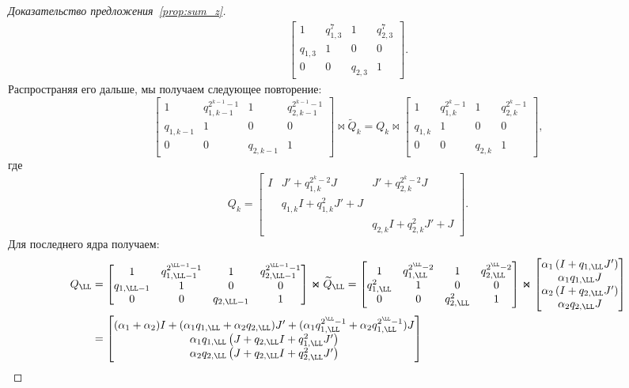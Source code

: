 \begin{proof}[Доказательство предложения~\ref{prop:sum_z}]
\[\begin{split}
\begin{bmatrix}
	1 & q_{1,3}^7 & 1 & q_{2,3}^7 \\
	q_{1,3} & 1 & 0 & 0 \\
	0 & 0 & q_{2,3} & 1
	\end{bmatrix}.
	\end{split} 
	\]
	Распространяя его дальше, мы получаем следующее повторение:
	\[
	\begin{bmatrix}
	1 & q_{1,k-1}^{2^{k-1}-1} & 1 & q_{2,k-1}^{2^{k-1}-1} \\
	q_{1,k-1}& 1 & 0 & 0 \\
	0 & 0 & q_{2,k-1} & 1 
	\end{bmatrix}
	\Join
	{\widetilde Q}_k
	=
	Q_k \Join 
	\begin{bmatrix}
	1 & q_{1,k}^{2^{k}-1} & 1 & q_{2,k}^{2^{k}-1} \\
	q_{1,k}& 1 & 0 & 0 \\
	0 & 0 & q_{2,k} & 1 
	\end{bmatrix},
	\]
	где
	\[
	Q_k = 
	\begin{bmatrix}
	I & J' + q_{1,k}^{2^{k}-2} J & J' + q_{2,k}^{2^{k}-2} J \\
	& q_{1,k} I + q_{1,k}^2 J' + J \\
	& & q_{2,k} I + q_{2,k}^2 J' + J
	\end{bmatrix}.
	\]
	Для последнего ядра получаем:
	\[
	\begin{split}
	Q_\LL &=
	\begin{bmatrix}
	1 & q_{1,\LL-1}^{2^{\LL-1}-1} & 1 & q_{2,\LL-1}^{2^{\LL-1}-1} \\
	q_{1,\LL-1}& 1 & 0 & 0 \\
	0 & 0 & q_{2,\LL-1} & 1 
	\end{bmatrix}
	\Join
	{\widetilde Q}_\LL
	= 
	\begin{bmatrix}
	1 & q_{1,\LL}^{2^{\LL}-2} & 1 & q_{2,\LL}^{2^{\LL}-2} \\
	q_{1,\LL}^2 & 1 & 0 & 0 \\
	0 & 0 & q_{2,\LL}^2 & 1
	\end{bmatrix}
	\Join
	\begin{bmatrix}
	\alpha_1 \left(I + q_{1,\LL}J' \right) \\
	\alpha_1 q_{1,\LL} J \\
	\alpha_2 \left(I + q_{2,\LL}J' \right) \\
	\alpha_2 q_{2,\LL} J 
	\end{bmatrix}
	\\
	&= 
	\begin{bmatrix}
	(\alpha_1 + \alpha_2) I + (\alpha_1 q_{1,\LL} + \alpha_2 q_{2,\LL}) J' + (\alpha_1 q_{1,\LL}^{2^{\LL}-1}+ \alpha_2 q_{1,\LL}^{2^{\LL}-1}) J \\
	\alpha_1 q_{1,\LL} \left(J + q_{2,\LL}I + q_{1,\LL}^2 J' \right)\\
	\alpha_2 q_{2,\LL} \left(J + q_{2,\LL}I + q_{2,\LL}^2 J' \right)
	\end{bmatrix}
	\end{split}
	\]
\end{proof}



